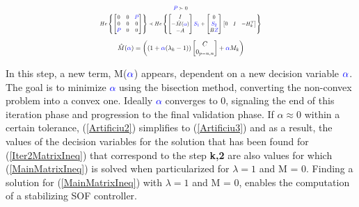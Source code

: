 \begin{equation}
\centering
\resizebox{0.48\textwidth}{!}{$
    \begin{gathered}
        \textcolor{blue}{P} \succ 0 \\
        He\left\{ \begin{bmatrix}
            0 & 0 & \textcolor{blue}{P}\\
            0 & 0 & 0\\
            \textcolor{blue}{P} & 0 & 0
        \end{bmatrix}\right\}
    \prec
    He\left\{\begin{bmatrix}
           I\\
                -\hat{M}(\textcolor{blue}{\alpha})\\
            -A
    \end{bmatrix}
    \textcolor{blue}{S_1} +
    \begin{bmatrix}
        0\\
        \textcolor{blue}{S_2}\\
        B\textcolor{blue}{Z}
    \end{bmatrix}
    \begin{bmatrix}
        0 & I & -H_k^T
    \end{bmatrix}\right\}
    \end{gathered}$}
    \label{Iter2MatrixIneq}
\end{equation}
\begin{equation}
\resizebox{0.38\textwidth}{!}{$
    \begin{gathered}
        \hat{M}(\textcolor{blue}{\alpha}) = \left((1+\textcolor{blue}{\alpha} (\lambda_k-1))
        \begin{bmatrix}
            C \\
            0_{p-n,n}
        \end{bmatrix}
        +
        \textcolor{blue}{\alpha} M_k\right)
    \end{gathered}$}
    \label{Artificiu2}
\end{equation}

In this step, a new term, M($\textcolor{blue}{\alpha}$) appears, dependent on a new decision variable $\textcolor{blue}{\alpha}$. The goal is to minimize \textcolor{blue}{$\alpha$} using the bisection method, converting the non-convex problem into a convex one. Ideally \textcolor{blue}{$\alpha$} converges to 0, signaling the end of this iteration phase and progression to the final validation phase. If $\alpha \approx 0$ within a certain tolerance, (\ref{Artificiu2}) simplifies to (\ref{Artificiu3}) and as a result, the values of the decision variables for the solution that has been found for (\ref{Iter2MatrixIneq}) that correspond to the step \textbf{k,2} are also values for which (\ref{MainMatrixIneq}) is solved when particularized for $\lambda = 1$ and M = 0. Finding a solution for (\ref{MainMatrixIneq}) with $\lambda = 1$ and M = 0, enables the computation of a stabilizing SOF controller.

